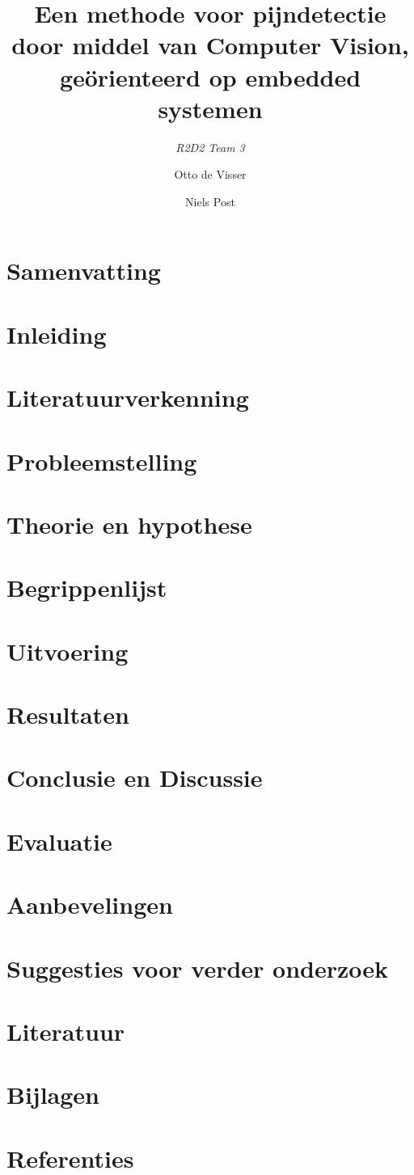 \documentclass[11pt]{article}
\title{Een methode voor pijndetectie door middel van Computer Vision, geörienteerd op embedded systemen}
\author{\emph{R2D2 Team 3} \and Otto de Visser \and Niels Post}
\begin{document}
    \maketitle

    \clearpage

    \tableofcontents

    \clearpage


    \section{Samenvatting}
    \section{Inleiding}
    \section{Literatuurverkenning}
    \section{Probleemstelling}
    \section{Theorie en hypothese}
    \section{Begrippenlijst}
    \section{Uitvoering}
    \section{Resultaten}
    \section{Conclusie en Discussie}
    \section{Evaluatie}
    \section{Aanbevelingen}
    \section{Suggesties voor verder onderzoek}
    \section{Literatuur}
    \section{Bijlagen}
    \section{Referenties}
\end{document}
